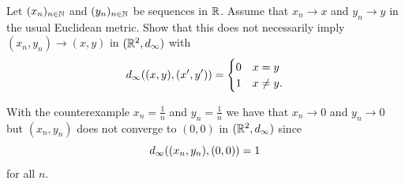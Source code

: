 
\begin{exercise}[subtitle={Incompatible metric \Coffeecup}]
    \label{ex: incompatible metric}
    Let \((x_n)_{n\in \mathbb{N}}\) and \((y_n)_{n\in \mathbb{N}}\) be sequences in
    \(\mathbb{R}\). Assume that \(x_n \to x\) and \(y_n \to y\) in the usual
    Euclidean metric.
    Show that this does not necessarily imply \((x_n, y_n) \to (x,y)\)
    in \((\mathbb{R}^2, d_\infty)\) with
    \[
        d_\infty((x,y), (x',y'))
        = \begin{cases}
            0 & x=y\\
            1 & x\neq y.
        \end{cases}
    \]
\end{exercise}

\begin{solution}
    With the counterexample \(x_n = \frac1n\) and \(y_n = \frac1n\) we have
    that \(x_n \to 0\) and \(y_n \to 0\) but \((x_n, y_n)\) does not
    converge to \((0,0)\) in \((\mathbb{R}^2, d_\infty)\) since
    \[
        d_\infty((x_n, y_n), (0,0)) = 1
    \] for all \(n\).
\end{solution}
